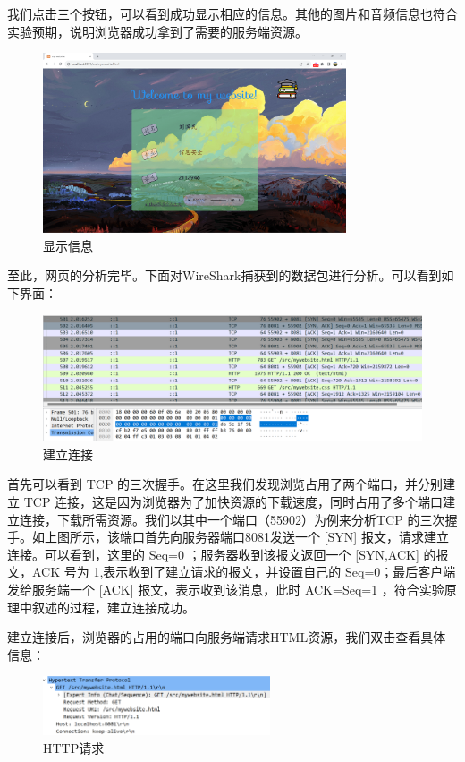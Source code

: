 \documentclass[UTF8,a4paper,10pt]{ctexart}
\begin{document}
我们点击三个按钮，可以看到成功显示相应的信息。其他的图片和音频信息也符合实验预期，说明浏览器成功拿到了需要的服务端资源。
\begin{figure}[H]
    \centering
\includegraphics[width=0.8\textwidth]{img/显示信息.png}
    \caption{显示信息}
\end{figure}
至此，网页的分析完毕。下面对WireShark捕获到的数据包进行分析。可以看到如下界面：
\begin{figure}[H]
    \centering
\includegraphics[width=1.0\textwidth]{img/三次握手.png}
    \caption{建立连接}
\end{figure}
首先可以看到 TCP 的三次握手。在这里我们发现浏览占用了两个端口，并分别建立 TCP 连接，这是因为浏览器为了加快资源的下载速度，同时占用了多个端口建立连接，下载所需资源。我们以其中一个端口（55902）为例来分析TCP 的三次握手。如上图所示，该端口首先向服务器端口8081发送一个 [SYN] 报文，请求建立连接。可以看到，这里的 Seq=0 ；服务器收到该报文返回一个 [SYN,ACK] 的报文，ACK 号为 1,表示收到了建立请求的报文，并设置自己的 Seq=0；最后客户端发给服务端一个 [ACK] 报文，表示收到该消息，此时 ACK=Seq=1 ，符合实验原理中叙述的过程，建立连接成功。\par
建立连接后，浏览器的占用的端口向服务端请求HTML资源，我们双击查看具体信息：
\begin{figure}[H]
    \centering
\includegraphics[width=0.6\textwidth]{img/HTTP请求.png}
    \caption{HTTP请求}
\end{figure}
\end{document}
